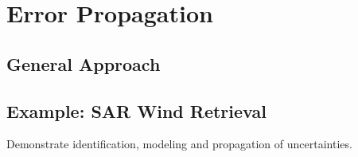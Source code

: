 \documentclass[pdftex,12pt,a4paper,oneside]{article}
\numberwithin{equation}{section} %
\begin{document}
\section{Error Propagation}

\subsection{General Approach}
\subsection{Example: SAR Wind Retrieval}

Demonstrate identification, modeling and propagation of uncertainties.

%
%
%
%
%




\end{document}
